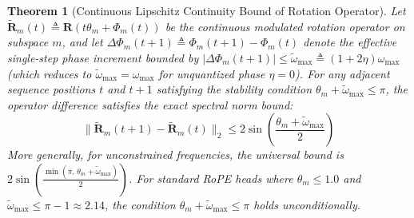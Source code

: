 \documentclass[11pt,a4paper]{article}
\newtheorem{theorem}{Theorem}
\theoremstyle{definition}
\begin{document}
\begin{theorem}[Continuous Lipschitz Continuity Bound of Rotation Operator]
\label{thm:lipschitz}
Let $\tilde{\mathbf{R}}_m(t) \triangleq \mathbf{R}(t\theta_m + \Phi_m(t))$ be the continuous modulated rotation operator on subspace $m$, and let $\Delta\Phi_m(t+1) \triangleq \Phi_m(t+1) - \Phi_m(t)$ denote the effective single-step phase increment bounded by $|\Delta\Phi_m(t+1)| \le \tilde{\omega}_{\max} \triangleq (1 + 2\eta)\omega_{\max}$ (which reduces to $\tilde{\omega}_{\max} = \omega_{\max}$ for unquantized phase $\eta = 0$). For any adjacent sequence positions $t$ and $t+1$ satisfying the stability condition $\theta_m + \tilde{\omega}_{\max} \le \pi$, the operator difference satisfies the exact spectral norm bound:
\begin{equation}
\|\tilde{\mathbf{R}}_m(t+1) - \tilde{\mathbf{R}}_m(t)\|_2 \le 2\sin\left(\frac{\theta_m + \tilde{\omega}_{\max}}{2}\right)
\end{equation}
More generally, for unconstrained frequencies, the universal bound is $2\sin\left(\frac{\min(\pi, \, \theta_m + \tilde{\omega}_{\max})}{2}\right)$. For standard RoPE heads where $\theta_m \le 1.0$ and $\tilde{\omega}_{\max} \le \pi - 1 \approx 2.14$, the condition $\theta_m + \tilde{\omega}_{\max} \le \pi$ holds unconditionally.
\end{theorem}
\end{document}
